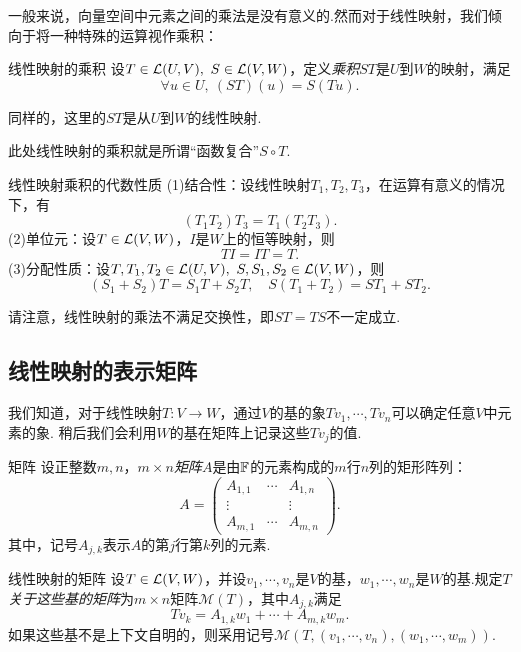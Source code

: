 一般来说，向量空间中元素之间的乘法是没有意义的.然而对于线性映射，我们倾向于将一种特殊的运算视作乘积：

\begin{definition}{线性映射的乘积}
	设$T \in \mathcal{L} (U,V),~S \in \mathcal{L} (V,W)$，定义\textit{乘积}$ST$是$U$到$W$的映射，满足$$\forall u \in U,~(ST)(u)=S(Tu).$$
\end{definition}
\begin{remark}
	同样的，这里的$ST$是从$U$到$W$的线性映射.
\end{remark}
\begin{remark}
	此处线性映射的乘积就是所谓“函数复合”$S \circ T$.
\end{remark}

\begin{proposition}{线性映射乘积的代数性质} \label{pro:xmxkykueigji}
	(1)结合性：设线性映射$T_1,T_2,T_3$，在运算有意义的情况下，有$$(T_1T_2)T_3=T_1(T_2T_3).$$
	(2)单位元：设$T \in \mathcal{L} (V,W)$，$I$是$W$上的恒等映射，则$$TI=IT=T.$$
	(3)分配性质：设$T,T_1,T_2 \in \mathcal{L} (U,V),~S,S_1,S_2 \in \mathcal{L} (V,W)$，则$$(S_1+S_2)T=S_1T+S_2T,\quad S(T_1+T_2)=ST_1+ST_2.$$
\end{proposition}

请注意，线性映射的乘法不满足交换性，即$ST=TS$不一定成立.



\subsection{线性映射的表示矩阵}

我们知道，对于线性映射$T:V \to W$，通过$V$的基的象$Tv_1, \cdots ,Tv_n$可以确定任意$V$中元素的象. 稍后我们会利用$W$的基在矩阵上记录这些$Tv_j$的值.

\begin{definition}{矩阵}
	设正整数$m,n$，$m \times n$\textit{矩阵}$A$是由$\mathbb{F}$的元素构成的$m$行$n$列的矩形阵列：$$A = 
	\begin{pmatrix}
		A_{1,1} & \cdots & A_{1,n} \\
		\vdots &  & \vdots \\
		A_{m,1} & \cdots & A_{m,n}
	\end{pmatrix}.$$
	其中，记号$A_{j,k}$表示$A$的第$j$行第$k$列的元素.
\end{definition}

\begin{definition}{线性映射的矩阵}
	设$T \in \mathcal{L} (V,W)$，并设$v_1, \cdots ,v_n$是$V$的基，$w_1, \cdots ,w_n$是$W$的基.规定$T$\textit{关于这些基的矩阵}为$m \times n$矩阵$\mathcal{M}(T)$，其中$A_{j,k}$满足$$Tv_k = A_{1,k}w_1 + \cdots + A_{m,k}w_m.$$
	如果这些基不是上下文自明的，则采用记号$\mathcal{M}(T,(v_1, \cdots ,v_n),(w_1, \cdots ,w_m))$.
\end{definition}

